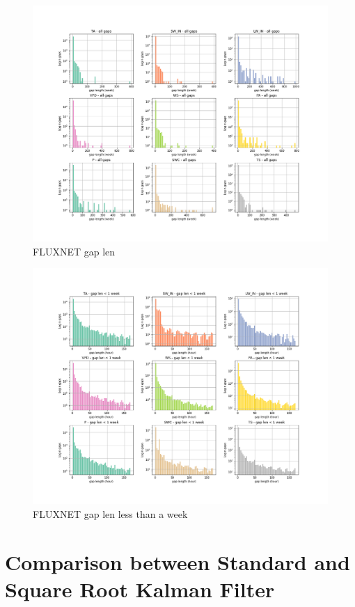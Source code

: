 \documentclass{article}
\newcommand{\imgwidth}{6in}
\let\Oldsection\section
\renewcommand{\section}{\FloatBarrier\Oldsection}
\begin{document}
\begin{figure}
\centerline{\includegraphics[width=\imgwidth]{gap_len_dist}}
\caption{FLUXNET gap len}
\label{fig:gap_len_dist}
\end{figure}
\begin{figure}
\centerline{\includegraphics[width=\imgwidth]{gap_len_dist_small}}
\caption{FLUXNET gap len less than a week}
\label{fig:gap_len_dist_small}
\end{figure}



\section{Comparison between Standard and Square Root Kalman Filter}
\end{document}
